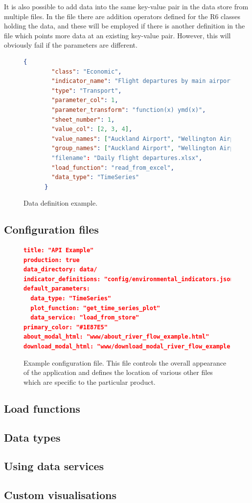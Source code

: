 \documentclass[12pt]{article}
\begin{document}
It is also possible to add data into the same key-value pair in the data store from multiple files.  In the  file there are addition operators defined for the R6 classes holding the data, and these will be employed if there is another definition in the  file which points more data at an existing key-value pair.  However, this will obviously fail if the  parameters are different.


\begin{figure}
\footnotesize
\begin{lstlisting}[language=json,firstnumber=1]
      {
        "class": "Economic",
        "indicator_name": "Flight departures by main airports",
        "type": "Transport",
        "parameter_col": 1,
        "parameter_transform": "function(x) ymd(x)",
        "sheet_number": 1,
        "value_col": [2, 3, 4],
        "value_names": ["Auckland Airport", "Wellington Airport"],
        "group_names": ["Auckland Airport", "Wellington Airport"]
        "filename": "Daily flight departures.xlsx",
        "load_function": "read_from_excel",
        "data_type": "TimeSeries"
      }
\end{lstlisting}
\caption{Data definition example.}\label{fig:data_definition}
\end{figure}


\subsection*{Configuration files}
\begin{figure}
\footnotesize
\begin{lstlisting}[language=json,firstnumber=1]
title: "API Example"
production: true
data_directory: data/
indicator_definitions: "config/environmental_indicators.json"
default_parameters:
  data_type: "TimeSeries"
  plot_function: "get_time_series_plot"
  data_service: "load_from_store"
primary_color: "#1E87E5"
about_modal_html: "www/about_river_flow_example.html"
download_modal_html: "www/download_modal_river_flow_example.html"
\end{lstlisting}
\caption{Example configuration file.  This file controls the overall appearance of the application and defines the location of various other files which are specific to the particular product.}\label{fig:indicator_definition}
\end{figure}


\subsection*{Load functions}

\subsection*{Data types}

\subsection*{Using data services}

\subsection*{Custom visualisations}



\clearpage%
\thispagestyle{empty}
\end{document}
